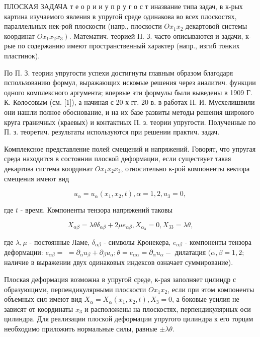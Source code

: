 \documentclass[10pt]{article}
\begin{document}
ПЛОСКАЯ ЗАДАЧА т е о р и и у п р у г о с т иназвание типа задач, в к-рых картина изучаемого явления в упругой среде одинакова во всех плоскостях, параллельных нек-рой плоскости (напр., плоскости $O x_{1} x_{2}$ декартовой системы координат $\left.O x_{1} x_{2} x_{3}\right)$. Математич. теорией П. З. часто описываются и задачи, к-рые по содержанию имеют пространственный характер (напр., изгиб тонких пластинок).



По П. З. теории упругости успехи достигнуты главным образом благодаря пспользованию формул, выражающих искомые решения через аналитич. функции одного комплексного аргумента; впервые эти формулы были выведены в 1909 Г. К. Колосовым (см. [1]), а начиная с 20-х гг. 20 в. в работах Н. И. Мусхелишвили они нашли полное обоснование, и на их базе развиты методы решения широкого круга граничных (краевых) и контактных П. з. теории упругости. Полученные по П. з. теоретич. результаты используются при решении практич. задач.



Комплексное представление полей смещений и напряжений. Говорят, что упругая среда находится в состоянии плоской деформации, если существует такая декартова система координат $O x_{1} x_{2} x_{3}$, относительно к-рой компоненты вектора смещения имеют вид



\[

u_{\alpha}=u_{\alpha}\left(x_{1}, x_{2}, t\right), \alpha=1,2, u_{3}=0 \text {, }

\]



где $t$ - время. Компоненты тензора напряжений таковы



\[

X_{\alpha \beta}=\lambda \theta \delta_{\alpha \beta}+2 \mu e_{\alpha \beta}, X_{\alpha_{3}}=0, X_{33}=\lambda \theta,

\]



где $\lambda, \mu$ - постоянные Ламе, $\delta_{\alpha \beta}$ - символы Кронекера, $e_{\alpha \beta}$ - компоненты тензора деформации: $e_{\alpha \beta}=$ $=\partial_{\alpha} u_{\beta}+\partial_{\beta} u_{\alpha} ; \theta=e_{\alpha \alpha}=\partial_{\alpha} u_{\alpha}-$ дилатация $(\alpha, \beta=1,2$; наличие в выражении двух одинаковых индексов означает суммирование).



Плоская деформация возможна в упругой среде, к-рая заполняет цилиндр с образующими, перпендикулярными плоскости $O x_{1} x_{2}$, если при этом компоненты объемных сил имеют вид $X_{\alpha}=X_{\alpha}\left(x_{1}, x_{2}, t\right), X_{3}=0$, а боковые усилия не зависят от координаты $x_{3}$ и расположены на плоскостях, перпендикулярных оси цилиндра. Для реализации плоской деформации упругого цилиндра к его торцам необходимо приложить нормальные силы, равные $\pm \lambda \theta$.
\end{document}
